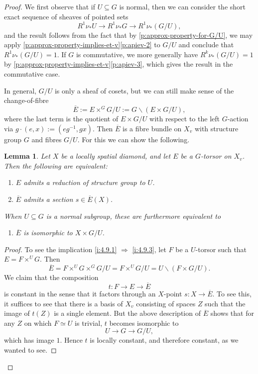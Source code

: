 \documentclass[10pt,a4paper]{article}
\newtheorem{Lemma}[thm]{Lemma}
\theoremstyle{definition}
\theoremstyle{remark}
\newcommand{\lra}{\longrightarrow}
\numberwithin{equation}{section}
\begin{document}
\begin{proof}
	We first observe that if $U\subseteq G$ is normal, then we can consider the short exact sequence of sheaves of pointed sets
	\[ R^1\nu_{\ast}U\lra  R^1\nu_{\ast}G\lra  R^1\nu_{\ast}(G/U),\]
	and the result follows from the fact that by \cref{p:approx-property-for-G/U}, we may apply \cref{p:approx-property-implies-et-v}\eqref{p:apiev-2} to $G/U$ and conclude that  $R^1\nu_{\ast}(G/U)=1$. If $G$ is commutative, we more generally have $R^k\nu_{\ast}(G/U)=1$ by \cref{p:approx-property-implies-et-v}\eqref{p:apiev-3}, which gives the result in the commutative case.
	
	In general, $G/U$ is only a sheaf of cosets, but we can still make sense of the change-of-fibre
	\[\overline{E}:=E\times^GG/U:=G\backslash(E\times G/U), \]
	where the last term is the quotient of $E\times G/U$ with respect to the left $G$-action via $g\cdot (e,x):=(eg^{-1},gx)$. Then $\overline{E}$ is a fibre bundle on $X_v$ with structure group $G$ and fibres $G/U$. For this we can show the following. 


	       \begin{Lemma}\label{l:section-of-fibre-bundle}
			Let $X$ be a locally spatial diamond, and let $E$ be a $G$-torsor on $X_v$. Then the following are equivalent: 
			\begin{enumerate}
				\item\label{i:4.9.1} $E$ admits a reduction of structure group to $U$.
				\item\label{i:4.9.3} $\overline{E}$ admits a section $s\in \overline{E}(X)$.
			\end{enumerate}
			When $U\subseteq G$ is a normal subgroup, these are furthermore equivalent to 
			
			\begin{enumerate}[resume]
			\item\label{i:4.9.2} $\overline{E}$ is isomorphic to $X\times G/U$.
			\end{enumerate}
		\end{Lemma}

	\begin{proof}
			To see the implication 	\eqref{i:4.9.1} $\Rightarrow$ \eqref{i:4.9.3}, let $F$ be a $U$-torsor such that $E=F\times^UG$. Then
			\[ \overline{E}=F\times^UG\times^GG/U=F\times^UG/U=U\backslash(F\times G/U).\]
			We claim that the composition
			\[ t\colon F\lra E\lra \overline{E}\]
			is constant in the sense that it factors through an $X$-point $s\colon X\to \overline{E}$. To see this, it suffices to see that there is a basis of $X_v$ consisting of spaces $Z$ such that the image of $t(Z)$ is a single element. But the above description of $\overline{E}$ shows that for any $Z$ on which $F\simeq U$ is trivial, $t$ becomes isomorphic to
			\[ U\lra G\lra G/U,\]
			which  has image $1$. Hence $t$ is locally constant, and therefore constant, as we wanted to see.
			

\end{proof}
\end{proof}
\end{document}
